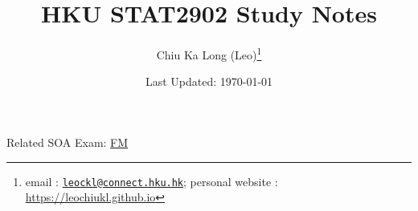 \documentclass{article}
\begin{document}
\title{HKU STAT2902 Study Notes}
\author{Chiu Ka Long (Leo)\thanks{email :
\href{mailto:leockl@connect.hku.hk}{\texttt{leockl@connect.hku.hk}};
personal website :
\url{https://leochiukl.github.io}
}}
\date{Last Updated: \today}
\maketitle
\doclicenseThis
\nocite{*}
\begin{note}
Related SOA Exam:
\href{https://www.soa.org/education/exam-req/edu-exam-fm-detail.aspx}{FM}
\end{note}
\tableofcontents







\printbibliography

\end{document}
